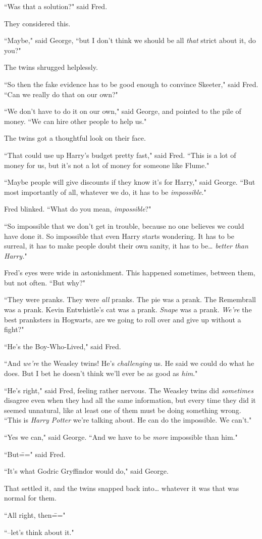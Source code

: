 ``Was that a solution?" said Fred.

They considered this.

``Maybe," said George, ``but I don't think we should be all \emph{that} strict about it, do you?"

The twins shrugged helplessly.

``So then the fake evidence has to be good enough to convince Skeeter," said Fred. ``Can we really do that on our own?"

``We don't have to do it on our own," said George, and pointed to the pile of money. ``We can hire other people to help us."

The twins got a thoughtful look on their face.

``That could use up Harry's budget pretty fast," said Fred. ``This is a lot of money for us, but it's not a lot of money for someone like Flume."

``Maybe people will give discounts if they know it's for Harry," said George. ``But most importantly of all, whatever we do, it has to be \emph{impossible}."

Fred blinked. ``What do you mean, \emph{impossible}?"

``So impossible that we don't get in trouble, because no one believes we could have done it. So impossible that even Harry starts wondering. It has to be surreal, it has to make people doubt their own sanity, it has to be{\ldots} \emph{better than Harry.}"

Fred's eyes were wide in astonishment. This happened sometimes, between them, but not often. ``But why?"

``They were pranks. They were \emph{all} pranks. The pie was a prank. The Remembrall was a prank. Kevin Entwhistle's cat was a prank. \emph{Snape} was a prank. \emph{We're} the best pranksters in Hogwarts, are we going to roll over and give up without a fight?"

``He's the Boy-Who-Lived," said Fred.

``And \emph{we're} the Weasley twins! He's \emph{challenging} us. He said we could do what he does. But I bet he doesn't think we'll ever be as good as \emph{him}."

``He's right," said Fred, feeling rather nervous. The Weasley twins did \emph{sometimes} disagree even when they had all the same information, but every time they did it seemed unnatural, like at least one of them must be doing something wrong. ``This is \emph{Harry Potter} we're talking about. He can do the impossible. We can't."

``Yes we can," said George. ``And we have to be \emph{more} impossible than him."

``But\===" said Fred.

``It's what Godric Gryffindor would do," said George.

That settled it, and the twins snapped back into{\ldots} whatever it was that was normal for them.

``All right, then\==="

``\---let's think about it."


